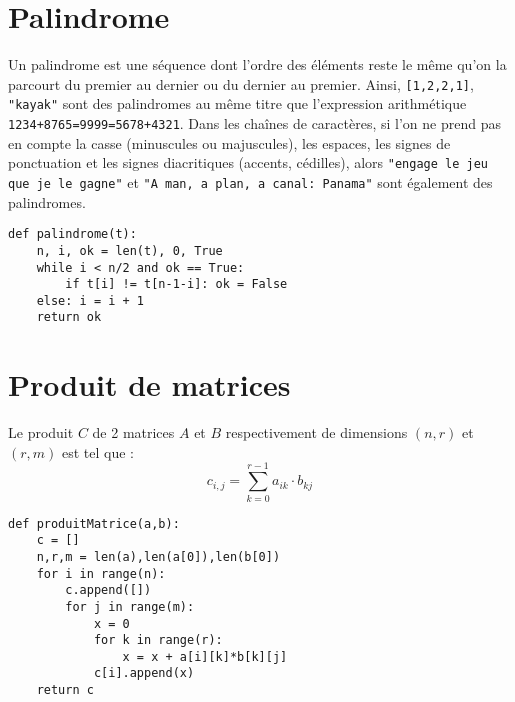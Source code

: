 \section*{Palindrome}
Un palindrome est une séquence dont l'ordre des éléments reste le même 
qu'on la parcourt du premier au dernier ou du dernier au premier.
Ainsi, {\tt [1,2,2,1]}, {\tt "kayak"} sont des palindromes au même
titre que l'expression arithmétique {\tt 1234+8765=9999=5678+4321}.
Dans les chaînes de caractères, si l'on ne prend pas en compte la casse 
(minuscules ou majuscules), les espaces, les signes de ponctuation
et les signes diacritiques (accents, cédilles), alors 
{\tt "engage le jeu que je le gagne"} et {\tt "A man, a plan, a canal: Panama"} 
sont également des palindromes.

\newpage
{}
\begin{lstlisting}[caption={\bf Palindrome},label=cl:palindrome]
def palindrome(t):
    n, i, ok = len(t), 0, True
    while i < n/2 and ok == True:
        if t[i] != t[n-1-i]: ok = False
	else: i = i + 1
    return ok      
\end{lstlisting}

\section*{Produit de matrices}

Le produit $C$ de 2 matrices $A$ et $B$ respectivement de dimensions 
$(n,r)$ et $(r,m)$ est tel que :
$$c_{i,j} = \sum_{k=0}^{r-1}a_{ik}\cdot b_{kj}$$

\begin{lstlisting}[caption={\bf Produit de matrices},label=cl:produitMatrices]
def produitMatrice(a,b):
    c = []
    n,r,m = len(a),len(a[0]),len(b[0])
    for i in range(n):
        c.append([])
        for j in range(m):
            x = 0
            for k in range(r):
                x = x + a[i][k]*b[k][j]
            c[i].append(x)
    return c
\end{lstlisting}

